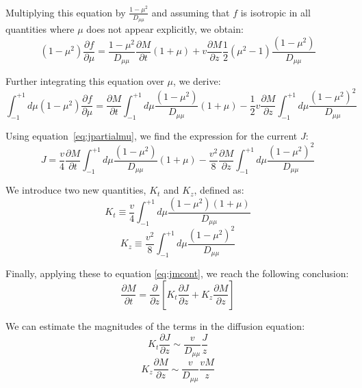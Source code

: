 Multiplying this equation by \( \frac{1-\mu^2}{D_{\mu\mu}} \) and assuming that \( f \) is isotropic in all quantities where \( \mu \) does not appear explicitly, we obtain:
%
\begin{equation}
(1-\mu^2)\frac{\partial f}{\partial \mu}=\frac{1-\mu^2}{D_{\mu\mu}} \frac{\partial M}{\partial t}(1+\mu) + v\frac{\partial M}{\partial z}\frac{1}{2} (\mu^2-1)\frac{(1-\mu^2)}{D_{\mu\mu}}
\end{equation}

Further integrating this equation over \( \mu \), we derive:
%
\begin{equation}
\int_{-1}^{+1} d\mu (1-\mu^2)\frac{\partial f}{\partial \mu} =\frac{\partial M}{\partial t}\int_{-1}^{+1} d\mu \frac{(1-\mu^2)}{D_{\mu\mu}}(1+\mu) -\frac{1}{2}v\frac{\partial M}{\partial z}\int_{-1}^{+1} d\mu \frac{(1-\mu^2)^2}{D_{\mu\mu}}
\end{equation}

Using equation~\eqref{eq:jpartialmu}, we find the expression for the current \( J \):
%
\begin{equation}
J = \frac{v}{4}\frac{\partial M}{\partial t}\int_{-1}^{+1} d\mu \frac{(1-\mu^2)}{D_{\mu\mu}}(1+\mu) -\frac{v^2}{8}\frac{\partial M}{\partial z}\int_{-1}^{+1} d\mu \frac{(1-\mu^2)^2}{D_{\mu\mu}}
\end{equation}

We introduce two new quantities, \( K_t \) and \( K_z \), defined as:
%
\begin{equation}
K_t \equiv \frac{v}{4} \int_{-1}^{+1}d\mu \frac{(1-\mu^2)(1+\mu)}{D_{\mu\mu}} 
\end{equation}
\begin{equation}\label{eq:kzz}
K_z \equiv \frac{v^2}{8}\int_{-1}^{+1} d\mu \frac{(1-\mu^2)^2}{D_{\mu\mu}}
\end{equation}

Finally, applying these to equation \eqref{eq:jmcont}, we reach the following conclusion:
%
\begin{equation}
\frac{\partial M}{\partial t} = \frac{\partial }{\partial z}\left[ K_t\frac{\partial J}{\partial z} + K_z\frac{\partial M}{\partial z}  \right]
\end{equation}


We can estimate the magnitudes of the terms in the diffusion equation:
%
\begin{equation}
K_t \frac{\partial J}{\partial z}\sim \frac{v}{D_{\mu\mu}}\frac{J}{z}
\end{equation}
\begin{equation}
K_z\frac{\partial M}{\partial z} \sim \frac{v}{D_{\mu\mu}}\frac{vM}{z}
\end{equation}

